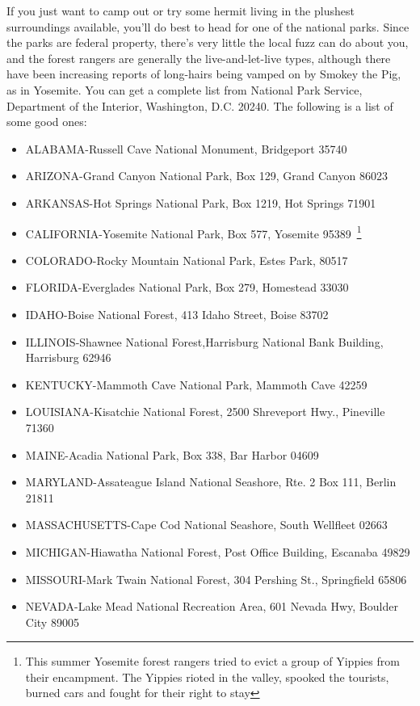 \documentclass[11pt,twoside,a4paper]{book}
\begin{document}
If you just want to camp out or try some hermit living in the plushest surroundings available, you'll do best to head for one of the national parks. Since the parks are federal property, there's very little the local fuzz can do about you, and the forest rangers are generally the live-and-let-live types, although there have been increasing reports of long-hairs being vamped on by Smokey the Pig, as in Yosemite. You can get a complete list from National Park Service, Department of the Interior, Washington, D.C. 20240. The following is a list of some good ones: 
\begin{small} \begin{itemize}
	\item ALABAMA-Russell Cave National Monument, Bridgeport 35740
	\item ARIZONA-Grand Canyon National Park, Box 129, Grand Canyon 86023 
	\item ARKANSAS-Hot Springs 	National Park, Box 1219, Hot Springs 71901 
	\item CALIFORNIA-Yosemite National Park, Box 577, Yosemite 95389~\footnote{This summer Yosemite forest rangers tried to evict a group of Yippies from their encampment. The Yippies rioted in the valley, spooked the tourists, burned cars and fought for their right to stay}%
	\item COLORADO-Rocky Mountain 	National Park, Estes Park, 80517 
	\item FLORIDA-Everglades National Park, Box 279, Homestead 	33030 
	\item IDAHO-Boise National Forest, 413 Idaho Street, Boise 83702 
	\item ILLINOIS-Shawnee National 	Forest,Harrisburg National Bank Building, Harrisburg 62946 	
	\item KENTUCKY-Mammoth Cave National Park, Mammoth Cave 42259 
	\item LOUISIANA-Kisatchie National Forest, 2500 Shreveport Hwy., Pineville 71360 			
	\item MAINE-Acadia National Park, Box 338, Bar Harbor 04609 
	\item MARYLAND-Assateague Island National Seashore, Rte. 2 Box 111, Berlin 21811 
	\item MASSACHUSETTS-Cape Cod National Seashore, South Wellfleet 02663 
	\item MICHIGAN-Hiawatha National Forest, Post Office Building, Escanaba 49829 
	\item MISSOURI-Mark Twain National Forest, 304 Pershing St., Springfield 65806 
	\item NEVADA-Lake Mead National Recreation Area, 601 Nevada Hwy, Boulder City 89005 

\end{itemize}
\end{small}
\end{document}
